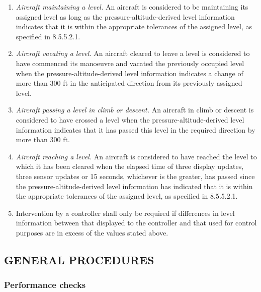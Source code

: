 \documentclass[../main.tex]{subfiles}
\begin{document}
\begin{enumerate}[itemsep=0.2cm]
\begin{enumerate}
            \item \textit{Aircraft maintaining a level.} An aircraft is considered to be maintaining its assigned level as long as the pressure-altitude-derived level information indicates that it is within the appropriate tolerances of the assigned level, as specified in 8.5.5.2.1.
            \item \textit{Aircraft vacating a level.} An aircraft cleared to leave a level is considered to have commenced its manoeuvre and vacated the previously occupied level when the pressure-altitude-derived level information indicates a change of more than 300 ft in the anticipated direction from its previously assigned level.
            \item \textit{Aircraft passing a level in climb or descent.} An aircraft in climb or descent is considered to have crossed a level when the pressure-altitude-derived level information indicates that it has passed this level in the required direction by more than 300 ft.
            \item \textit{Aircraft reaching a level.} An aircraft is considered to have reached the level to which it has been cleared when the elapsed time of three display updates, three sensor updates or 15 seconds, whichever is the greater, has passed since the pressure-altitude-derived level information has indicated that it is within the appropriate tolerances of the assigned level, as specified in 8.5.5.2.1.
            \item Intervention by a controller shall only be required if differences in level information between that displayed to the controller and that used for control purposes are in excess of the values stated above.
        \end{enumerate}
    \end{enumerate}

    \subsection[General procedures]{GENERAL PROCEDURES}

    \subsubsection{Performance checks}
\end{document}
